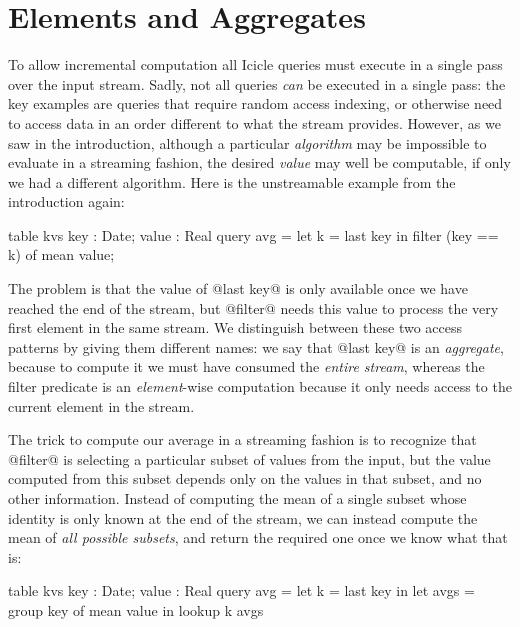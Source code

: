 
\chapter{Elements and Aggregates}
\label{icicle:s:ElementsAndAggregates}
To allow incremental computation all Icicle queries must execute in a single pass over the input stream.
Sadly, not all queries \emph{can} be executed in a single pass: the key examples are queries that require random access indexing, or otherwise need to access data in an order different to what the stream provides.
However, as we saw in the introduction, although a particular \emph{algorithm} may be impossible to evaluate in a streaming fashion, the desired \emph{value} may well be computable, if only we had a different algorithm.
Here is the unstreamable example from the introduction again:
\begin{code}
  table kvs { key : Date; value : Real }
  query avg = let k = last key
              in  filter (key == k) of mean value;
\end{code}

The problem is that the value of @last key@ is only available once we have reached the end of the stream, but @filter@ needs this value to process the very first element in the same stream.
We distinguish between these two access patterns by giving them different names: we say that @last key@ is an \emph{aggregate}, because to compute it we must have consumed the \emph{entire stream}, whereas the filter predicate is an \emph{element}-wise computation because it only needs access to the current element in the stream.

The trick to compute our average in a streaming fashion is to recognize that @filter@ is selecting a particular subset of values from the input, but the value computed from this subset depends only on the values in that subset, and no other information. Instead of computing the mean of a single subset whose identity is only known at the end of the stream, we can instead compute the mean of \emph{all possible subsets}, and return the required one once we know what that is:
\begin{code}
  table kvs { key : Date; value : Real } 
  query avg = let k    = last  key in
              let avgs = group key of mean value
              in  lookup k avgs
\end{code}

